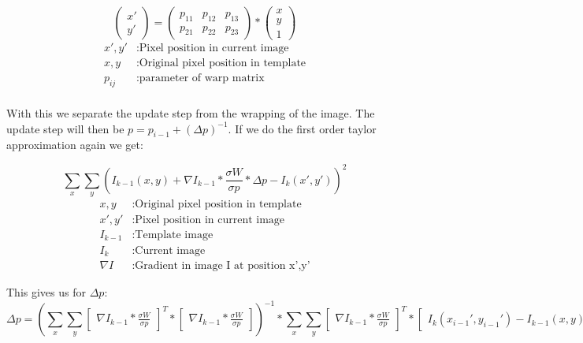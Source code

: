 \documentclass[11pt,a4paper,titlepage,oneside]{report}
\begin{document}
\begin{equation}
	\begin{pmatrix}
		x' \\
		y'
	\end{pmatrix}=
	\begin{pmatrix}
		p_{11} & p_{12} & p_{13} \\
		p_{21} & p_{22} & p_{23}
	\end{pmatrix}*
	\begin{pmatrix}
		x\\
		y\\
		1
	\end{pmatrix}
\end{equation}
\begin{align*}
	x',y'					&:	\text{Pixel position in current image}\\
	x,y						&:	\text{Original pixel position in template}\\
	p_{ij}				&:	\text{parameter of warp matrix}\\
\end{align*}

With this we separate the update step from the wrapping of the image. The update step will then be $p=p_{i-1}+(\Delta p)^{-1}$. If we do the first order taylor approximation again we get:

\begin{equation}\label{eq:iclk_taylor}
	\sum_x\sum_y(I_{k-1}(x,y)+\nabla I_{k-1}*\frac{\sigma W}{\sigma p}*\Delta p-I_{k}(x',y'))^2
\end{equation}
\begin{align*}
	x,y				&:	\text{Original pixel position in template}\\
	x',y'			&:	\text{Pixel position in current image}\\
	I_{k-1}		&:	\text{Template image}\\
	I_{k}			&:	\text{Current image}\\
	\nabla I	&:	\text{Gradient in image I at position x',y'}
\end{align*}

This gives us for $\Delta p$:
\begin{equation}\label{eq:iclk_dp}
	\Delta p=(\sum_x\sum_y\begin{bmatrix}\nabla I_{k-1}*\frac{\sigma W}{\sigma p}\end{bmatrix}^T*\begin{bmatrix}\nabla I_{k-1}*\frac{\sigma W}{\sigma p}\end{bmatrix})^{-1}
	*\sum_x\sum_y\begin{bmatrix}\nabla I_{k-1}*\frac{\sigma W}{\sigma p}\end{bmatrix}^T*\begin{bmatrix}I_{k}(x_{i-1}',y_{i-1}') - I_{k-1}(x,y)\end{bmatrix}
\end{equation}
\end{document}
